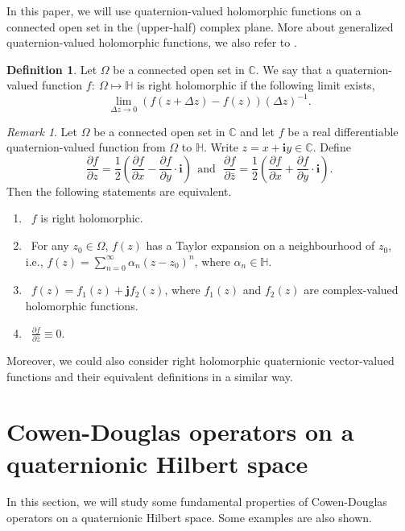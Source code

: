 \documentclass[pdflatex,sn-mathphys-num]{sn-jnl}%
\theoremstyle{thmstyleone}%
\theoremstyle{thmstyletwo}%
\newtheorem{remark}{Remark}%
\theoremstyle{thmstylethree}%
\newtheorem{definition}{Definition}%
\theoremstyle{definition}
\newtheorem{definition}[theorem]{Definition}
\theoremstyle{remark}
\newtheorem{remark}[theorem]{Remark}
\begin{document}
In this paper, we will use quaternion-valued holomorphic functions on a connected open set in the (upper-half) complex plane. More about generalized quaternion-valued holomorphic functions, we also refer to \cite{CSS}.
\begin{definition}
Let $\Omega$ be a connected open set in $\mathbb{C}$. We say that a quaternion-valued function $f:\ \Omega\mapsto\mathbb{H}$ is right holomorphic if the following limit exists,
\[
\lim_{\Delta z\rightarrow0}(f(z+\Delta z)-f(z))(\Delta z)^{-1}.
\]
\end{definition}

\begin{remark}
Let $\Omega$ be a connected open set in $\mathbb{C}$ and let $f$ be a real differentiable quaternion-valued function from $\Omega$ to $\mathbb{H}$. Write $z=x+\boldsymbol{i}y\in\mathbb{C}$. Define
\[
\frac{\partial f}{\partial z}=\frac{1}{2}\left(\frac{\partial f}{\partial x}-\frac{\partial f}{\partial y}\cdot\boldsymbol{i} \right) \ \ \text{and} \ \ \
\frac{\partial f}{\partial \bar{z}}=\frac{1}{2}\left(\frac{\partial f}{\partial x}+\frac{\partial f}{\partial y}\cdot\boldsymbol{i} \right).
\]
Then the following  statements are equivalent.
\begin{enumerate}
	\item[(1)] \ $f$ is right holomorphic.
	\item[(2)] \ For any $z_0\in \Omega$, $f(z)$ has a Taylor expansion on a neighbourhood of $z_0$, i.e.,
 $f(z)=\sum_{n=0}^{\infty}\alpha_n(z-z_0)^n$,  where  $\alpha_n\in\mathbb{H}$.
	\item[(3)] \  $f(z)=f_1(z)+\boldsymbol{j}f_2(z)$, where $f_1(z)$ and $f_2(z)$ are complex-valued holomorphic functions.
	\item[(4)] \  $\frac{\partial f}{\partial \bar{z}}\equiv 0$.
\end{enumerate}
Moreover, we could also consider right holomorphic quaternionic vector-valued functions and their equivalent definitions in a similar way.
\end{remark}


\section{Cowen-Douglas operators on a quaternionic Hilbert space}\label{sec3}

In this section, we will study some fundamental properties of  Cowen-Douglas operators on a quaternionic Hilbert space. Some examples are also shown.
\end{document}
